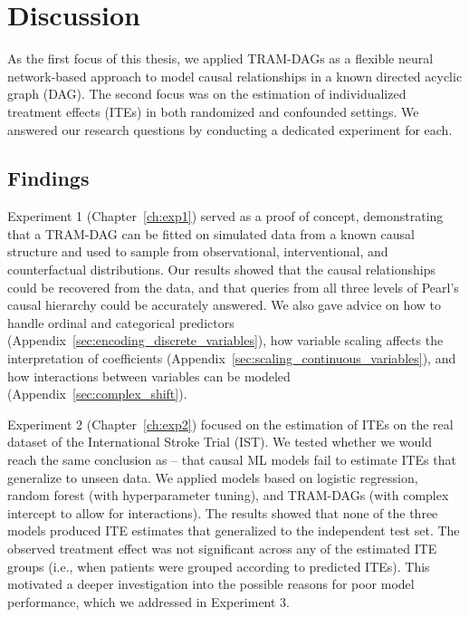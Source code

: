 



\chapter{Discussion}


As the first focus of this thesis, we applied TRAM-DAGs as a flexible neural network-based approach to model causal relationships in a known directed acyclic graph (DAG). The second focus was on the estimation of individualized treatment effects (ITEs) in both randomized and confounded settings. We answered our research questions by conducting a dedicated experiment for each.

\section{Findings}

\medskip

Experiment 1 (Chapter~\ref{ch:exp1}) served as a proof of concept, demonstrating that a TRAM-DAG can be fitted on simulated data from a known causal structure and used to sample from observational, interventional, and counterfactual distributions. Our results showed that the causal relationships could be recovered from the data, and that queries from all three levels of Pearl's causal hierarchy could be accurately answered. We also gave advice on how to handle ordinal and categorical predictors (Appendix~\ref{sec:encoding_discrete_variables}), how variable scaling affects the interpretation of coefficients (Appendix~\ref{sec:scaling_continuous_variables}), and how interactions between variables can be modeled (Appendix~\ref{sec:complex_shift}).

\medskip

Experiment 2 (Chapter~\ref{ch:exp2}) focused on the estimation of ITEs on the real dataset of the International Stroke Trial (IST). We tested whether we would reach the same conclusion as \citet{chen2025} -- that causal ML models fail to estimate ITEs that generalize to unseen data. We applied models based on logistic regression, random forest (with hyperparameter tuning), and TRAM-DAGs (with complex intercept to allow for interactions). The results showed that none of the three models produced ITE estimates that generalized to the independent test set. The observed treatment effect was not significant across any of the estimated ITE groups (i.e., when patients were grouped according to predicted ITEs). This motivated a deeper investigation into the possible reasons for poor model performance, which we addressed in Experiment 3.


